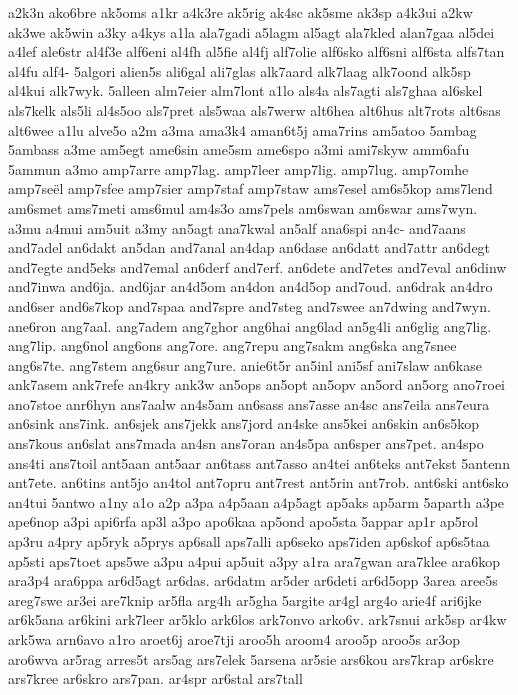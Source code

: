 a2k3n
ako6bre
ak5oms
a1kr
a4k3re
ak5rig
ak4sc
ak5sme
ak3sp
a4k3ui
a2kw
ak3we
ak5win
a3ky
a4kys
a1la
ala7gadi
a5lagm
al5agt
ala7kled
alan7gaa
al5dei
a4lef
ale6str
al4f3e
alf6eni
al4fh
al5fie
al4fj
alf7olie
alf6sko
alf6sni
alf6sta
alfs7tan
al4fu
alf4-
5algori
alien5s
ali6gal
ali7glas
alk7aard
alk7laag
alk7oond
alk5sp
al4kui
alk7wyk.
5alleen
alm7eier
alm7lont
a1lo
als4a
als7agti
als7ghaa
al6skel
als7kelk
als5li
al4s5oo
als7pret
als5waa
als7werw
alt6hea
alt6hus
alt7rots
alt6sas
alt6wee
a1lu
alve5o
a2m
a3ma
ama3k4
aman6t5j
ama7rins
am5atoo
5ambag
5ambass
a3me
am5egt
ame6sin
ame5sm
ame6spo
a3mi
ami7skyw
amm6afu
5ammun
a3mo
amp7arre
amp7lag.
amp7leer
amp7lig.
amp7lug.
amp7omhe
amp7seël
amp7sfee
amp7sier
amp7staf
amp7staw
ams7esel
am6s5kop
ams7lend
am6smet
ams7meti
ams6mul
am4s3o
ams7pels
am6swan
am6swar
ams7wyn.
a3mu
a4mui
am5uit
a3my
an5agt
ana7kwal
an5alf
ana6spi
an4c-
and7aans
and7adel
an6dakt
an5dan
and7anal
an4dap
an6dase
an6datt
and7attr
an6degt
and7egte
and5eks
and7emal
an6derf
and7erf.
an6dete
and7etes
and7eval
an6dinw
and7inwa
and6ja.
and6jar
an4d5om
an4don
an4d5op
and7oud.
an6drak
an4dro
and6ser
and6s7kop
and7spaa
and7spre
and7steg
and7swee
an7dwing
and7wyn.
ane6ron
ang7aal.
ang7adem
ang7ghor
ang6hai
ang6lad
an5g4li
an6glig
ang7lig.
ang7lip.
ang6nol
ang6ons
ang7ore.
ang7repu
ang7sakm
ang6ska
ang7snee
ang6s7te.
ang7stem
ang6sur
ang7ure.
anie6t5r
an5inl
ani5sf
ani7slaw
an6kase
ank7asem
ank7refe
an4kry
ank3w
an5ops
an5opt
an5opv
an5ord
an5org
ano7roei
ano7stoe
anr6hyn
ans7aalw
an4s5am
an6sass
ans7asse
an4sc
ans7eila
ans7eura
an6sink
ans7ink.
an6sjek
ans7jekk
ans7jord
an4ske
ans5kei
an6skin
an6s5kop
ans7kous
an6slat
ans7mada
an4sn
ans7oran
an4s5pa
an6sper
ans7pet.
an4spo
ans4ti
ans7toil
ant5aan
ant5aar
an6tass
ant7asso
an4tei
an6teks
ant7ekst
5antenn
ant7ete.
an6tins
ant5jo
an4tol
ant7opru
ant7rest
ant5rin
ant7rob.
ant6ski
ant6sko
an4tui
5antwo
a1ny
a1o
a2p
a3pa
a4p5aan
a4p5agt
ap5aks
ap5arm
5aparth
a3pe
ape6nop
a3pi
api6rfa
ap3l
a3po
apo6kaa
ap5ond
apo5sta
5appar
ap1r
ap5rol
ap3ru
a4pry
ap5ryk
a5prys
ap6sall
aps7alli
ap6seko
aps7iden
ap6skof
ap6s5taa
ap5sti
aps7toet
aps5we
a3pu
a4pui
ap5uit
a3py
a1ra
ara7gwan
ara7klee
ara6kop
ara3p4
ara6ppa
ar6d5agt
ar6das.
ar6datm
ar5der
ar6deti
ar6d5opp
3area
aree5s
areg7swe
ar3ei
are7knip
ar5fla
arg4h
ar5gha
5argite
ar4gl
arg4o
arie4f
ari6jke
ar6k5ana
ar6kini
ark7leer
ar5klo
ark6los
ark7onvo
arko6v.
ark7snui
ark5sp
ar4kw
ark5wa
arn6avo
a1ro
aroet6j
aroe7tji
aroo5h
aroom4
aroo5p
aroo5s
ar3op
aro6wva
ar5rag
arres5t
ars5ag
ars7elek
5arsena
ar5sie
ars6kou
ars7krap
ar6skre
ars7kree
ar6skro
ars7pan.
ar4spr
ar6stal
ars7tall
